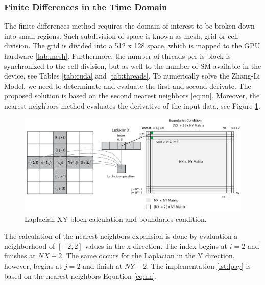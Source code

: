 \subsubsection{Finite Differences in the Time Domain}

The finite differences method requires the domain of interest to be broken down into small regions. Such subdivision of space is known as mesh, grid or cell division. The grid is divided into a 512 x 128 space, which is mapped to the GPU hardware \ref{tab:mesh}. Furthermore, the number of threads per is block is synchronized to the cell division, but as well to the number of SM available in the device, see Tables \ref{tab:cuda} and \ref{tab:threads}.
To numerically solve the Zhang-Li Model, we need to determinate and evaluate the first and second derivate. The proposed solution is based on the second nearest neighbors \ref{eq:nn}. Moreover, the nearest neighbors method evaluates the derivative of the input data, see Figure \ref{fig:laplacian}.

\begin{figure}[htbp]
	\centering
		\includegraphics[width=1.0\textwidth]{Figures/laplacian.png}
		\smallskip
	\caption[Laplacian block calculation]{Laplacian XY block calculation and boundaries condition.}
	\label{fig:laplacian}
\end{figure}

The calculation of the nearest neighbors expansion is done by evaluation a neighborhood of $[-2, 2]$ values in the x direction. The index begins at $i = 2$ and finishes at $NX + 2$. The same occurs for the Laplacian in the Y direction, however, begins at $j = 2$ and finish at $NY -2$.  The implementation \ref{lst:lpay} is based on the nearest neighbors Equation \ref{eq:nn}.

